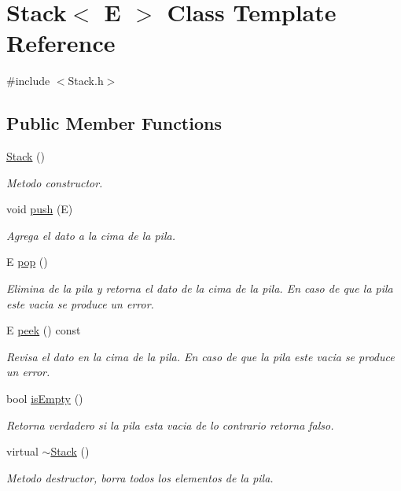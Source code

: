 \hypertarget{class_stack}{\section{Stack$<$ E $>$ Class Template Reference}
\label{class_stack}
}


{\ttfamily \#include $<$Stack.\-h$>$}

\subsection*{Public Member Functions}
\begin{DoxyCompactItemize}
\item 
\hyperlink{class_stack_a561be1726ac9649a9ee3f80a4ca8e4b5}{Stack} ()
\begin{DoxyCompactList}\small\item\em Metodo constructor. \end{DoxyCompactList}\item 
void \hyperlink{class_stack_af71e3e142fba5bb861b66b4882289b31}{push} (E)
\begin{DoxyCompactList}\small\item\em Agrega el dato a la cima de la pila. \end{DoxyCompactList}\item 
E \hyperlink{class_stack_a5ba7a4c8eec39757e28f95da49f06d52}{pop} ()
\begin{DoxyCompactList}\small\item\em Elimina de la pila y retorna el dato de la cima de la pila. En caso de que la pila este vacia se produce un error. \end{DoxyCompactList}\item 
E \hyperlink{class_stack_a19a17240bf7045cf6a3a9497e1091433}{peek} () const 
\begin{DoxyCompactList}\small\item\em Revisa el dato en la cima de la pila. En caso de que la pila este vacia se produce un error. \end{DoxyCompactList}\item 
bool \hyperlink{class_stack_a0ce2804f35c0c8cfb999535f35fa438b}{is\-Empty} ()
\begin{DoxyCompactList}\small\item\em Retorna verdadero si la pila esta vacia de lo contrario retorna falso. \end{DoxyCompactList}\item 
virtual \hyperlink{class_stack_ad08e4c32f07b8d967913f8b1a45f8620}{$\sim$\-Stack} ()
\begin{DoxyCompactList}\small\item\em Metodo destructor, borra todos los elementos de la pila. \end{DoxyCompactList}\end{DoxyCompactItemize}


